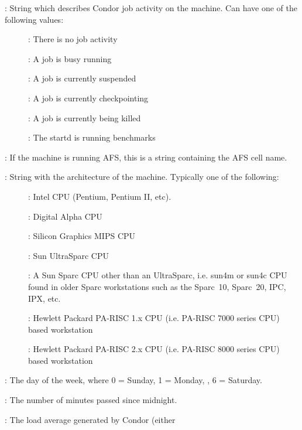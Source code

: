 \begin{description}
%
\item[\AdAttr{Activity}] : String which describes Condor job activity on the machine.
Can have one of the following values:
	\begin{description}
	\item[] : There is no job activity
	\item[] : A job is busy running
	\item[] : A job is currently suspended
	\item[] : A job is currently checkpointing
	\item[] : A job is currently being killed
	\item[] : The startd is running benchmarks
	\end{description}
%
\item[\AdAttr{AFSCell}] : If the machine is running AFS, this is a string
containing the AFS cell name.
%
\item[\AdAttr{Arch}] : String with the architecture of the machine.  Typically
one of the following: 
	\begin{description}
	\item[] : Intel CPU (Pentium, Pentium II, etc).
	\item[] : Digital Alpha CPU
	\item[] : Silicon Graphics MIPS CPU
	\item[] : Sun UltraSparc CPU
	\item[] : A Sun Sparc CPU other than an UltraSparc, i.e.
sun4m or sun4c CPU found in older Sparc workstations such as the Sparc~10, 
Sparc~20, IPC, IPX, etc.
	\item[] :  Hewlett Packard PA-RISC 1.x CPU (i.e. PA-RISC    
                      7000 series CPU) based workstation
	\item[] :  Hewlett Packard PA-RISC 2.x CPU (i.e. PA-RISC    
                      8000 series CPU) based workstation
	\end{description}
%
\item[\AdAttr{ClockDay}] : The day of the week, where 0 = Sunday, 1 = Monday, \Dots, 6 = Saturday. 
%
\item[\AdAttr{ClockMin}] : The number of minutes passed since midnight.
%
\item[\AdAttr{CondorLoadAvg}] : The load average generated by Condor (either

\end{description}
